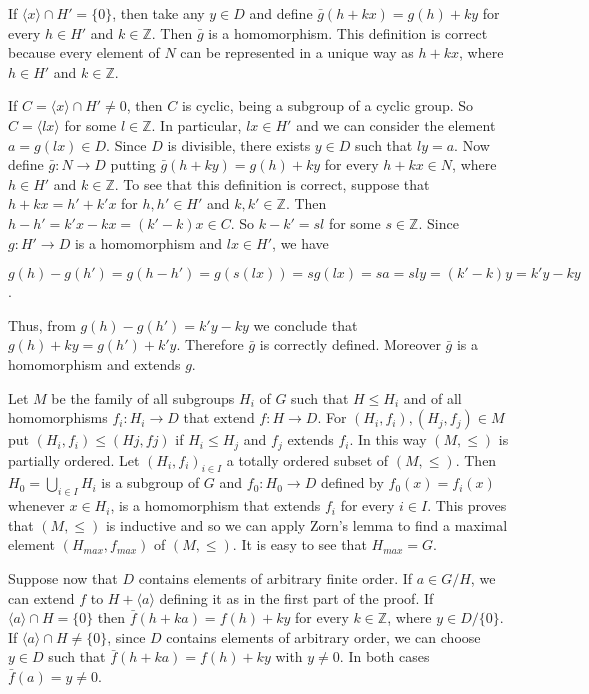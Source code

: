 \documentclass[12pt]{article}
\begin{document}
    If $ \langle x \rangle \cap H' = \{0\} $, then take any $ y \in D $ and define $ \bar{g}(h + kx) = g(h) + ky $ for every $ h \in H' $ and $ k \in \mathbb{Z} $. Then
$ \bar{g} $ is a homomorphism. This definition is correct because every element of $ N $ can be represented in a unique way
as $ h + kx $, where $ h \in H' $ and $ k \in \mathbb{Z} $.


    If $ C = \langle x \rangle \cap H' \neq {0} $, then $ C $ is cyclic, being a subgroup of a cyclic group. So $ C = \langle lx \rangle $ for some $l \in \mathbb{Z} $.
In particular, $ lx \in H' $ and we can consider the element $ a = g(lx) \in D $. Since $ D $ is divisible, there exists $ y \in D $
such that $ly = a$. Now define $ \bar{g} : N \to D $ putting $ \bar{g}(h + ky) = g(h) + ky $ for every $ h + kx \in N $, where $ h \in H' $
and $ k \in \mathbb{Z} $. To see that this definition is correct, suppose that $h + kx = h' + k'x$ for $ h, h' \in H' $ and $ k, k' \in \mathbb{Z} $.
Then $ h - h' = k'x - kx = (k' - k)x \in C $. So $k - k' = sl$ for some $ s \in \mathbb{Z} $. Since $ g : H' \to D $ is a homomorphism
and $ lx \in H' $, we have


$ g(h) - g(h') = g(h - h') = g(s(lx)) = sg(lx) = sa = sly = (k' - k)y = k'y - ky $.


    Thus, from $ g(h) - g(h') = k'y - ky $ we conclude that $ g(h) + ky = g(h') + k'y $. Therefore $ \bar{g} $ is correctly defined.
Moreover $ \bar{g} $ is a homomorphism and extends $ g $.


    Let $ M $ be the family of all subgroups $ H_i $ of $ G $ such that $ H \leq H_i $ and of all homomorphisms $ f_i : H_i \to D $
that extend $ f : H \to D $. For $ (H_i, f_i),(H_j , f_j ) \in M $ put $ (H_i, f_i) \leq (Hj , fj ) $ if $ H_i \leq H_j $ and $ f_j $ extends $ f_i $. In this
way $ (M, \leq) $ is partially ordered. Let $ {(H_i, f_i)}_{i \in I} $ a totally ordered subset of $ (M, \leq) $. Then $ H_0 = \bigcup_{i \in I} H_i $ is a
subgroup of $ G $ and $ f_0 : H_0 \to D $ defined by $ f_0 (x) = f_i (x) $ whenever $ x \in H_i $, is a homomorphism that extends
$ f_i $ for every $ i \in I $. This proves that $ (M, \leq) $ is inductive and so we can apply Zorn's lemma to find a maximal
element $ (H_{max}, f_{max}) $ of $ (M, \leq) $. It is easy to see that $ H_{max} = G $.


    Suppose now that $ D $ contains elements of arbitrary finite order. If $ a \in G / H $, we can extend $ f $ to $ H + \langle a \rangle $
defining it as in the first part of the proof. If $ \langle a \rangle \cap H = \{0\}$ then $ \bar{f}(h + ka) = f(h) + ky $ for every $ k \in \mathbb{Z} $, where
$ y \in D / \{0\} $. If $ \langle a \rangle \cap H \neq \{0\} $, since $ D $ contains elements of arbitrary order, we can choose $ y \in D $ such that
$ \bar{f}(h + ka) = f(h) + ky $ with $ y \neq 0 $. In both cases $ \bar{f}(a) = y \neq 0 $.
\end{document}
